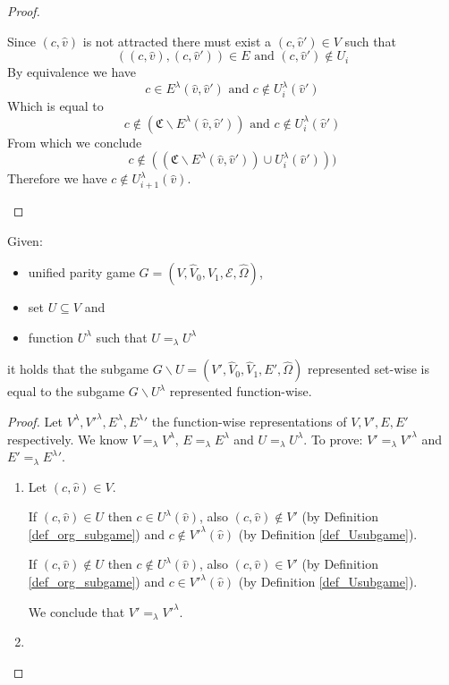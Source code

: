 \begin{lemma}
\begin{proof}
\begin{itemize}
			Since $(c,\hat{v})$ is not attracted there must exist a $(c,\hat{v}') \in V$ such that 
			\[ ((c,\hat{v}),(c,\hat{v}')) \in E  \text{ and } (c,\hat{v}') \notin U_i \]
			By equivalence we have 
			\[ c \in E^\lambda(\hat{v},\hat{v}')  \text{ and } c \notin U^\lambda_i(\hat{v}') \]
			Which is equal to
			\[ c \notin (\mathfrak{C} \backslash E^\lambda(\hat{v},\hat{v}'))  \text{ and } c \notin U^\lambda_i(\hat{v}') \]
			From which we conclude
			\[ c \notin ((\mathfrak{C} \backslash E^\lambda(\hat{v},\hat{v}')) \cup U^\lambda_i(\hat{v}'))) \]
			Therefore we have $c \notin U^\lambda_{i+1}(\hat{v})$.
		\end{itemize}
	\end{proof}
\end{lemma}

\begin{lemma}
	\label{lem_subgame_eq}
	Given:
	\begin{itemize}
		\item unified parity game $G = ({V},\hat{V}_0,\hat{V}_1, \mathcal{E}, \hat{\Omega})$,
		\item set ${U} \subseteq V$ and
		\item function $U^\lambda$ such that $U =_\lambda U^\lambda$
	\end{itemize}
it holds that the subgame $G \backslash {U} = ({V}',\hat{V}_0,\hat{V}_1,{E}',\hat{\Omega})$ represented set-wise is equal to the subgame $G\backslash U^\lambda$ represented function-wise.
	\begin{proof}
		Let  $V^\lambda,{V'}^\lambda, E^\lambda, {E^\lambda}'$ the function-wise representations of $V,V',E,E'$ respectively. We know $V =_\lambda V^\lambda$, $E =_\lambda E^\lambda$ and $U =_\lambda U^\lambda$. To prove: $V' =_\lambda {V'}^\lambda$ and $E' =_\lambda {E^\lambda}'$.
		
		\begin{enumerate}
			\item Let $(c,\hat{v}) \in V$.
			
			If $(c,\hat{v}) \in U$ then $c \in U^\lambda(\hat{v})$, also $(c,\hat{v}) \notin V'$ (by Definition \ref{def_org_subgame}) and $c \notin {V'}^\lambda(\hat{v})$ (by Definition \ref{def_Usubgame}).
			
			If $(c,\hat{v}) \notin U$ then $c \notin U^\lambda(\hat{v})$, also $(c,\hat{v}) \in V'$ (by Definition \ref{def_org_subgame}) and $c \in {V'}^\lambda(\hat{v})$ (by Definition \ref{def_Usubgame}).
			
			We conclude that $V' =_\lambda {V'}^\lambda$.
			\item 
			

\end{enumerate}
\end{proof}
\end{lemma}
